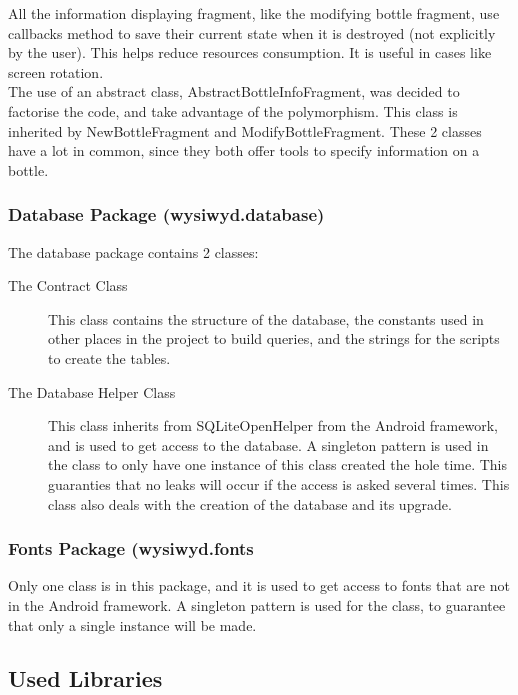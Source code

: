All the information displaying fragment, like the modifying bottle fragment, use callbacks method to save their current state when it is destroyed (not explicitly by the user). This helps reduce resources consumption. It is useful in cases like screen rotation.\\

The use of an abstract class, AbstractBottleInfoFragment, was decided to factorise the code, and take advantage of the polymorphism. This class is inherited by NewBottleFragment and ModifyBottleFragment. These 2 classes have a lot in common, since they both offer tools to specify information on a bottle.

\subsubsection{Database Package (wysiwyd.database)}

The database package contains 2 classes:

\begin{description}
\item[The Contract Class] This class contains the structure of the database, the constants used in other places in the project to build queries, and the strings for the scripts to create the tables.

\item[The Database Helper Class] This class inherits from SQLiteOpenHelper from the Android framework, and is used to get access to the database. A singleton pattern is used in the class to only have one instance of this class created the hole time. This guaranties that no leaks will occur if the access is asked several times. This class also deals with the creation of the database and its upgrade.
\end{description}

\subsubsection{Fonts Package (wysiwyd.fonts}

Only one class is in this package, and it is used to get access to fonts that are not in the Android framework. A singleton pattern is used for the class, to guarantee that only a single instance will be made.

\subsection{Used Libraries}
\label{used_libraries}


